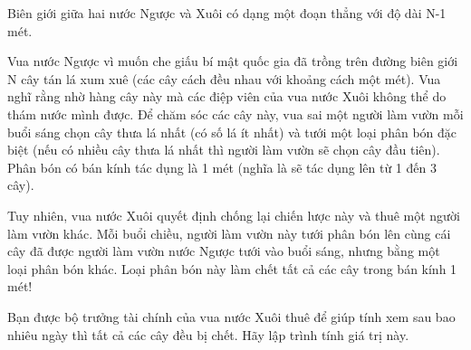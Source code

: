 Biên giới giữa hai nước Ngược và Xuôi có dạng một đoạn thẳng với độ dài N-1 mét.  

   Vua nước Ngược vì muốn che giấu bí mật quốc gia đã trồng trên đường biên giới N cây tán lá xum xuê (các cây cách đều nhau với khoảng cách một mét). Vua nghĩ rằng nhờ hàng cây này mà các điệp viên của vua nước Xuôi không thể do thám nước mình được. Để chăm sóc các cây này, vua sai một người làm vườn mỗi buổi sáng chọn cây thưa lá nhất (có số lá ít nhất) và tưới một loại phân bón đặc biệt (nếu có nhiều cây thưa lá nhất thì người làm vườn sẽ chọn cây đầu tiên). Phân bón có bán kính tác dụng là 1 mét (nghĩa là sẽ tác dụng lên từ 1 đến 3 cây).  

   Tuy nhiên, vua nước Xuôi quyết định chống lại chiến lược này và thuê một người làm vườn khác. Mỗi buổi chiều, người làm vườn này tưới phân bón lên cùng cái cây đã được người làm vườn nước Ngược tưới vào buổi sáng, nhưng bằng một loại phân bón khác. Loại phân bón này làm chết tất cả các cây trong bán kính 1 mét!  

   Bạn được bộ trưởng tài chính của vua nước Xuôi thuê để giúp tính xem sau bao nhiêu ngày thì tất cả các cây đều bị chết. Hãy lập trình tính giá trị này.